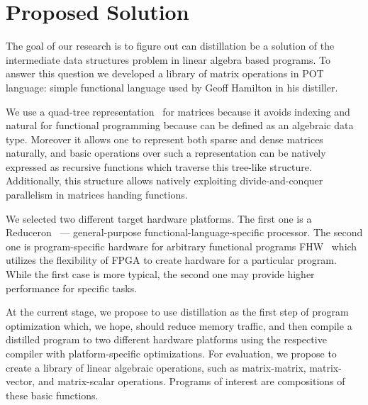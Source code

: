 \section{Proposed Solution}

The goal of our research is to figure out can distillation be a solution of the intermediate data structures problem in linear algebra based programs.
To answer this question we developed a library of matrix operations in POT language: simple functional language used by Geoff Hamilton in his distiller.  

We use a quad-tree representation~\cite{qtree} for matrices because it avoids indexing and natural for functional programming because can be defined as an algebraic data type.
Moreover it allows one to represent both sparse and dense matrices naturally, and basic operations over such a representation can be natively expressed as recursive functions which traverse this tree-like structure.
Additionally, this structure allows natively exploiting divide-and-conquer parallelism in matrices handing functions.

We selected two different target hardware platforms.
The first one is a Reduceron~\cite{naylorRunciman2012} --- general-purpose functional-language-specific processor.
The second one is program-specific hardware for arbitrary functional programs FHW~\cite{Edwards2019FHWP} which utilizes the flexibility of FPGA to create hardware for a particular program.
While the first case is more typical, the second one may provide higher performance for specific tasks.

At the current stage, we propose to use distillation as the first step of program optimization which, we hope, should reduce memory traffic, and then compile a distilled program to two different hardware platforms using the respective compiler with platform-specific optimizations.
For evaluation, we propose to create a library of linear algebraic operations, such as matrix-matrix, matrix-vector, and matrix-scalar operations.
Programs of interest are compositions of these basic functions.